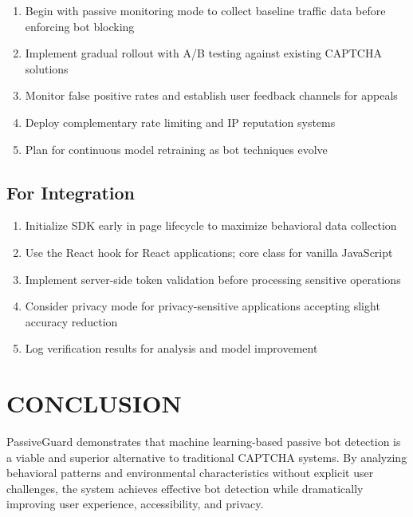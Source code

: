 \begin{enumerate}
    \item Begin with passive monitoring mode to collect baseline traffic data before enforcing bot blocking
    
    \item Implement gradual rollout with A/B testing against existing CAPTCHA solutions
    
    \item Monitor false positive rates and establish user feedback channels for appeals
    
    \item Deploy complementary rate limiting and IP reputation systems
    
    \item Plan for continuous model retraining as bot techniques evolve
\end{enumerate}

\subsection{For Integration}

\begin{enumerate}
    \item Initialize SDK early in page lifecycle to maximize behavioral data collection
    
    \item Use the React hook for React applications; core class for vanilla JavaScript
    
    \item Implement server-side token validation before processing sensitive operations
    
    \item Consider privacy mode for privacy-sensitive applications accepting slight accuracy reduction
    
    \item Log verification results for analysis and model improvement
\end{enumerate}

\section{CONCLUSION}

PassiveGuard demonstrates that machine learning-based passive bot detection is a viable and superior alternative to traditional CAPTCHA systems. By analyzing behavioral patterns and environmental characteristics without explicit user challenges, the system achieves effective bot detection while dramatically improving user experience, accessibility, and privacy.

